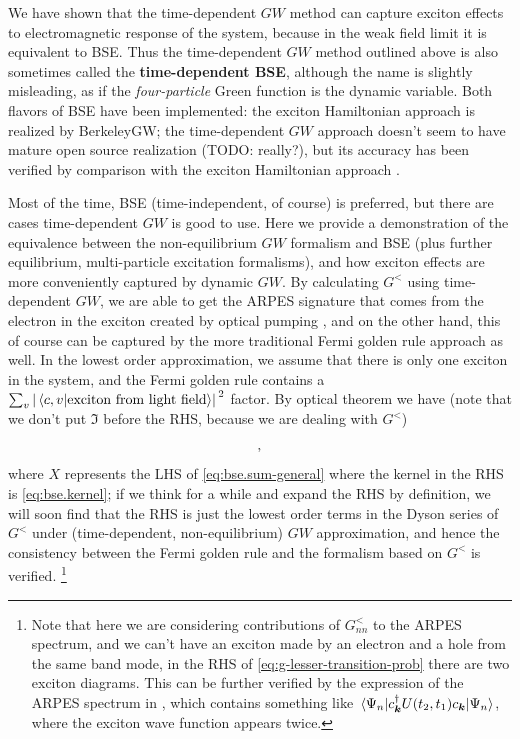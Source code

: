 \documentclass[hyperref, a4paper, 12pt]{report}
\newcommand*{\concept}[1]{{\textbf{#1}}}
\begin{document}
We have shown that the time-dependent $GW$ method 
can capture exciton effects to electromagnetic response of the system,
because in the weak field limit 
it is equivalent to BSE.
Thus the time-dependent $GW$ method outlined above 
is also sometimes called the \concept{time-dependent BSE},
although the name is slightly misleading, 
as if the \emph{four-particle} Green function is the dynamic variable.
Both flavors of BSE have been implemented:
the exciton Hamiltonian approach is realized by BerkeleyGW;
the time-dependent $GW$ approach doesn't seem to have mature open source realization (TODO: really?),
but its accuracy has been verified by comparison with the exciton Hamiltonian approach
\cite{attaccalite2011real}.

Most of the time, BSE (time-independent, of course) is preferred, 
but there are cases time-dependent $GW$ is good to use.
Here we provide a demonstration of the equivalence between the non-equilibrium $GW$ formalism 
and BSE (plus further equilibrium, multi-particle excitation formalisms),
and how exciton effects are more conveniently captured by dynamic $GW$.
By calculating $G^<$ using time-dependent $GW$, 
we are able to get the ARPES signature that comes from the electron 
in the exciton created by optical pumping \cite{perfetto2016first,rustagi2018photoemission},
and on the other hand,
this of course can be captured by the more traditional Fermi golden rule approach as well.
In the lowest order approximation, we assume that there is only one exciton in the system,
and the Fermi golden rule contains a $\sum_v \abs*{\braket*{c, v}{\text{exciton from light field}}}^2$ factor. 
By optical theorem we have (note that we don't put $\Im$ before the RHS, 
because we are dealing with $G^<$)
\begin{equation}
    \protect,
    \label{eq:g-lesser-transition-prob}
\end{equation}
where $X$ represents the LHS of \eqref{eq:bse.sum-general} 
where the kernel in the RHS is \eqref{eq:bse.kernel}; 
if we think for a while and expand the RHS by definition, 
we will soon find that the RHS is just the lowest order terms 
in the Dyson series of $G^<$ under (time-dependent, non-equilibrium) $GW$ approximation,
and hence the consistency between the Fermi golden rule and the formalism based on $G^<$ is verified.%
\footnote{
    Note that here we are considering contributions of $G^<_{nn}$ to the ARPES spectrum,
    and we can't have an exciton made by an electron and a hole from the same band mode,
    in the RHS of \eqref{eq:g-lesser-transition-prob} 
    there are two exciton diagrams.
    This can be further verified by the expression of the ARPES spectrum in \cite{rustagi2018photoemission},
    which contains something like $\mel{\Psi_n}{c^\dagger_{\vb*{k}} U(t_2 , t_1) c_{\vb*{k}}}{\Psi_n}$,
    where the exciton wave function appears twice.
}
\end{document}
